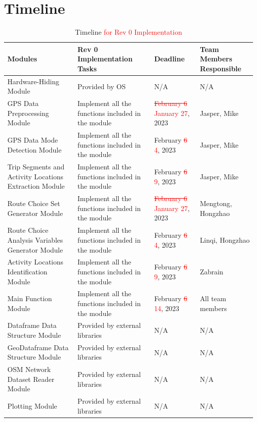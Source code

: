 \documentclass[12pt, titlepage]{article}
\begin{document}
\section{Timeline}
\begin{table}[h!]
    \centering
    \begin{tabular}{|>{\raggedright}p{}|p{}|p{}|p{}|}
    \hline
    \textbf{Modules} & \textbf{Rev 0 Implementation Tasks} & \textbf{Deadline} & \textbf{Team Members Responsible}\\
    \hline
     Hardware-Hiding Module & Provided by OS & N/A & N/A\\
    \hline
     GPS Data Preprocessing Module & Implement all the functions included in the module & \textcolor{red}{\sout{February 6} January 27}, 2023 & Jasper, Mike\\
    \hline
     GPS Data Mode Detection Module & Implement all the functions included in the module & February \textcolor{red}{\sout{6} 4}, 2023 & Jasper, Mike\\
    \hline
     Trip Segments and Activity Locations Extraction Module & Implement all the functions included in the module & February \textcolor{red}{\sout{6} 9}, 2023 & Jasper, Mike\\
    \hline
     Route Choice Set Generator Module & Implement all the functions included in the module & \textcolor{red}{\sout{February 6} January 27}, 2023 & Mengtong, Hongzhao\\
    \hline
     Route Choice Analysis Variables Generator Module & Implement all the functions included in the module & February \textcolor{red}{\sout{6} 4}, 2023 & Linqi, Hongzhao\\
    \hline
     Activity Locations Identification Module & Implement all the functions included in the module & February \textcolor{red}{\sout{6} 9}, 2023 & Zabrain\\
    \hline
     Main Function Module & Implement all the functions included in the module & February \textcolor{red}{\sout{6} 14}, 2023 & All team members\\
    \hline
     Dataframe Data Structure Module & Provided by external libraries & N/A & N/A\\
    \hline
     GeoDataframe Data Structure Module & Provided by external libraries & N/A & N/A\\
    \hline
     OSM Network Dataset Reader Module & Provided by external libraries & N/A & N/A\\
    \hline
     Plotting Module & Provided by external libraries & N/A & N/A\\
    \hline
    \end{tabular}
    \caption{Timeline \textcolor{red}{for Rev 0 Implementation}}
    \label{tab:timeline}
\end{table}
\end{document}
